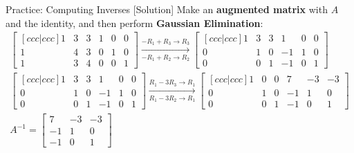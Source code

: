 \begin{frame}{Practice: Computing Inverses [Solution]}
    Make an \textbf{augmented matrix} with $A$ and the identity, and then perform \textbf{Gaussian Elimination}:
    \begin{align*}
        \begin{bmatrix}[c c c | c c c]
            1 & 3 & 3 & 1 & 0 & 0 \\
            1 & 4 & 3 & 0 & 1 & 0 \\
            1 & 3 & 4 & 0 & 0 & 1
        \end{bmatrix} \xrightarrow[-R_1 + R_2 \to R_2]{-R_1 + R_3 \to R_3}
        \begin{bmatrix}[c c c | c c c]
            1 & 3 & 3 & 1 & 0 & 0 \\
            0 & 1 & 0 & -1 & 1 & 0 \\
            0 & 0 & 1 & -1 & 0 & 1
        \end{bmatrix} \\
        \begin{bmatrix}[c c c | c c c]
            1 & 3 & 3 & 1 & 0 & 0 \\
            0 & 1 & 0 & -1 & 1 & 0 \\
            0 & 0 & 1 & -1 & 0 & 1
        \end{bmatrix} \xrightarrow[R_1 - 3R_2 \to R_1]{R_1 - 3R_3 \to R_1} 
        \begin{bmatrix}[c c c | c c c]
            1 & 0 & 0 & 7 & -3 & -3 \\
            0 & 1 & 0 & -1 & 1 & 0 \\
            0 & 0 & 1 & -1 & 0 & 1
        \end{bmatrix} \\[0.8ex]
        A^{-1} = \begin{bmatrix}
            7 & -3 & -3 \\
            -1 & 1 & 0 \\
            -1 & 0 & 1
        \end{bmatrix}
    \end{align*}
\end{frame}
